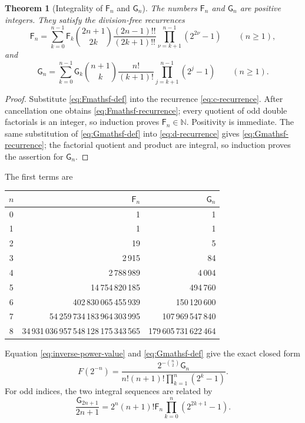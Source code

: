 \documentclass[11pt,oneside]{article}
\newtheorem{theorem}{Theorem}[section]
\theoremstyle{definition}
\theoremstyle{remark}
\newcommand{\N}{\mathbb N}
\begin{document}
\begin{theorem}[Integrality of $\mathsf F_n$ and $\mathsf G_n$]\label{thm:FG-integral}
The numbers $\mathsf F_n$ and $\mathsf G_n$ are positive integers.  They satisfy
the division-free recurrences
\begin{equation}\label{eq:Fmathsf-recurrence}
 \mathsf F_n=
 \sum_{k=0}^{n-1}\mathsf F_k\binom{2n+1}{2k}
 \frac{(2n-1)!!}{(2k+1)!!}
 \prod_{\nu=k+1}^{n-1}(2^{2\nu}-1)
 \qquad(n\ge1),
\end{equation}
and
\begin{equation}\label{eq:Gmathsf-recurrence}
 \mathsf G_n=
 \sum_{k=0}^{n-1}\mathsf G_k\binom{n+1}{k}
 \frac{n!}{(k+1)!}
 \prod_{j=k+1}^{n-1}(2^j-1)
 \qquad(n\ge1).
\end{equation}
\end{theorem}

\begin{proof}
Substitute \eqref{eq:Fmathsf-def} into the recurrence
\eqref{eq:c-recurrence}.  After cancellation one obtains
\eqref{eq:Fmathsf-recurrence}; every quotient of odd double factorials is an
integer, so induction proves $\mathsf F_n\in\N$.  Positivity is immediate.
The same substitution of \eqref{eq:Gmathsf-def} into
\eqref{eq:d-recurrence} gives \eqref{eq:Gmathsf-recurrence}; the factorial quotient
and product are integral, so induction proves the assertion for $\mathsf G_n$.
\end{proof}

The first terms are
\begin{center}
\begin{tabular}{c|r|r}
\toprule
$n$&$\mathsf F_n$&$\mathsf G_n$\\
\midrule
0&1&1\\
1&1&1\\
2&19&5\\
3&2\,915&84\\
4&2\,788\,989&4\,004\\
5&14\,754\,820\,185&494\,760\\
6&402\,830\,065\,455\,939&150\,120\,600\\
7&54\,259\,734\,183\,964\,303\,995&107\,969\,547\,840\\
8&34\,931\,036\,957\,548\,128\,175\,343\,565&179\,605\,731\,622\,464\\
\bottomrule
\end{tabular}
\end{center}

Equation \eqref{eq:inverse-power-value} and
\eqref{eq:Gmathsf-def} give the exact closed form
\begin{equation}\label{eq:F-inverse-G}
 F(2^{-n})=
 \frac{2^{-\binom n2}\mathsf G_n}
 {n!(n+1)!\prod_{k=1}^{n}(2^k-1)}.
\end{equation}
For odd indices, the two integral sequences are related by
\begin{equation}\label{eq:G-F-odd-relation}
 \frac{\mathsf G_{2n+1}}{2n+1}
 =2^n(n+1)!\mathsf F_n
  \prod_{k=0}^{n}(2^{2k+1}-1).
\end{equation}
\end{document}
